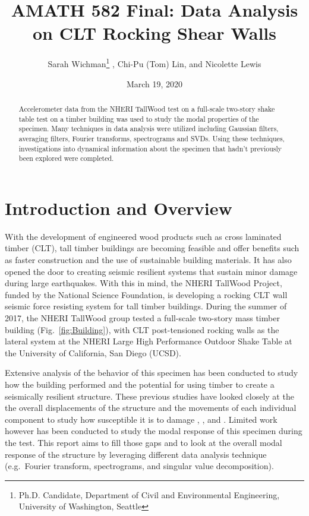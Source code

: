 \documentclass{article}
\title{AMATH 582 Final: Data Analysis on CLT Rocking Shear Walls}
\author{Sarah Wichman\thanks{Ph.D. Candidate, Department of Civil and Environmental Engineering, University of Washington, Seattle} , Chi-Pu (Tom) Lin\footnotemark[1] , and Nicolette Lewis\footnotemark[1]}
\date{March 19, 2020}
\begin{document}
\maketitle

\begin{abstract}
    Accelerometer data from the NHERI TallWood test on a full-scale two-story shake table test on a timber building was used to study the modal properties of the specimen. Many techniques in data analysis were utilized including Gaussian filters, averaging filters, Fourier transforms, spectrograms and SVDs. Using these techniques, investigations into dynamical information about the specimen that hadn't previously been explored were completed. 
\end{abstract}

\FloatBarrier
\section{Introduction and Overview}

With the development of engineered wood products such as cross laminated timber (CLT), tall timber buildings are becoming feasible and offer benefits such as faster construction and the use of sustainable building materials. It has also opened the door to creating seismic resilient systems that sustain minor damage during large earthquakes. With this in mind, the NHERI TallWood Project, funded by the National Science Foundation, is developing a rocking CLT wall seismic force resisting system for tall timber buildings. During the summer of 2017, the NHERI TallWood group tested a full-scale two-story mass timber building (Fig.\ \ref{fig:Building}), with CLT post-tensioned rocking walls as the lateral system at the NHERI Large High Performance Outdoor Shake Table at the University of California, San Diego (UCSD).

\medskip

Extensive analysis of the behavior of this specimen has been conducted to study how the building performed and the potential for using timber to create a seismically resilient structure. These previous studies have looked closely at the the overall displacements of the structure and the movements of each individual component to study how susceptible it is to damage \cite{Pei}, \cite{DeMeza}, and \cite{Wichman}. Limited work however has been conducted to study the modal response of this specimen during the test. This report aims to fill those gaps and to look at the overall modal response of the structure by leveraging different data analysis technique (e.g.\ Fourier transform, spectrograms, and singular value decomposition).
\end{document}
